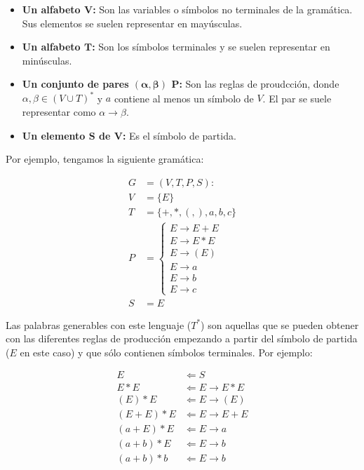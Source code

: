 \begin{itemize}
	\item\textbf{Un alfabeto $\boldsymbol{V}$:} Son las variables o símbolos no terminales de la gramática. Sus elementos se suelen representar en mayúsculas.
	\item\textbf{Un alfabeto $\boldsymbol{T}$:} Son los símbolos terminales y se suelen representar en minúsculas.
\item\textbf{Un conjunto de pares $\boldsymbol{(\alpha,\beta)}$ $\boldsymbol{P}$:} Son las reglas de proudcción, donde $\alpha, \beta \in {(V \cup T)}^*$ y $a$ contiene al menos un símbolo de $V$. El par se suele representar como $\alpha \rightarrow \beta$.
	\item\textbf{Un elemento $\boldsymbol{S}$ de $\boldsymbol{V}$:} Es el símbolo de partida.
\end{itemize}

Por ejemplo, tengamos la siguiente gramática:

\begin{align*}
	G &= (V, T, P, S) : \\
	V &= \{E\} \\
	T &= \{+, *, (,), a, b, c\} \\
	P &=
		\begin{cases}
			E \rightarrow E + E \\
			E \rightarrow E * E \\
			E \rightarrow (E)   \\
			E \rightarrow a     \\
			E \rightarrow b     \\
			E \rightarrow c
 		\end{cases} \\
	S &= E
\end{align*}

Las palabras generables con este lenguaje ($T^*$) son aquellas que se pueden obtener con las diferentes reglas de producción empezando a partir del símbolo de partida ($E$ en este caso) y que sólo contienen símbolos terminales.
Por ejemplo:

\begin{align*}
	E           & \Leftarrow S                   \\
	E * E       & \Leftarrow E \rightarrow E * E \\
	(E) * E     & \Leftarrow E \rightarrow (E)   \\
	(E + E) * E & \Leftarrow E \rightarrow E + E \\
	(a + E) * E & \Leftarrow E \rightarrow a     \\
	(a + b) * E & \Leftarrow E \rightarrow b     \\
	(a + b) * b & \Leftarrow E \rightarrow b
\end{align*}

